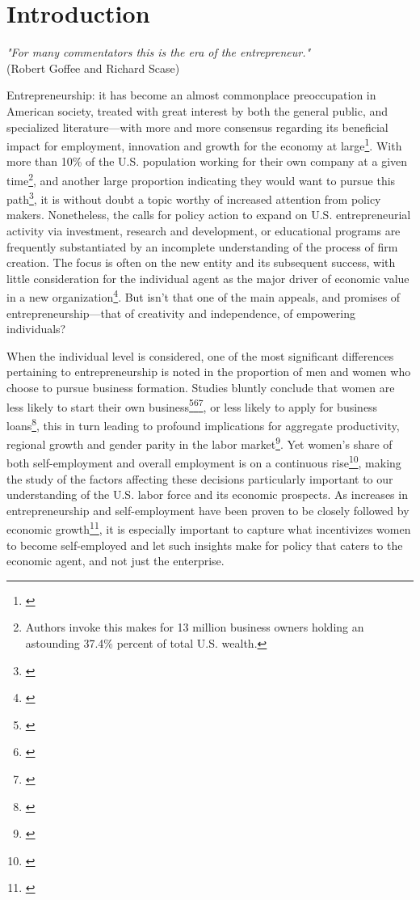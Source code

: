 \chapter{Introduction\label{ch:intro}}

\begin{flushright}
    \textit{"For many commentators this is the era of the entrepreneur." } \\
    (Robert Goffee and Richard Scase)
\end{flushright}


Entrepreneurship: it has become an almost commonplace preoccupation in American society, treated with great interest by both the general public, and specialized literature---with more and more consensus regarding its beneficial impact for employment, innovation and growth for the economy at large\footnote{\cite{ReynoldsWhite1997}}. With more than 10\% of the U.S. population working for their own company at a given time\footnote{Authors \cite{bucks2006recent} invoke this makes for 13 million business owners holding an astounding 37.4\% percent of total U.S. wealth. }, and another large proportion indicating they would want to pursue this path\footnote{\cite{kennickell2006currents}}, it is without doubt a topic worthy of increased attention from policy makers. Nonetheless, the calls for policy action to expand on U.S. entrepreneurial activity via investment, research and development, or educational programs are frequently substantiated by an incomplete understanding of the process of  firm creation.  The focus is often on the new entity and its subsequent success, with little consideration for the individual agent as the major driver of economic value in a new organization\footnote{\cite{BlanchflowerOswald1998}}. But isn't that one of the main appeals, and promises of entrepreneurship---that of creativity and independence, of empowering individuals?

When the individual level is considered, one of the most significant differences pertaining to
entrepreneurship is noted in the proportion of men and women who choose to pursue business formation. Studies bluntly conclude that women are less likely to start their own business\footnote{\cite{kennickell2006currents}}\hspace{.15em}\footnote{\cite{PatrickStephensWeinstein2016}}\hspace{.15em}\footnote{\cite{koellinger2013gender}}, or less likely to apply for business loans\footnote{\cite{SBA}}, this in turn leading to profound implications for aggregate productivity, regional growth and gender parity in the labor market\footnote{\cite{ReynoldsWhite1997}}. Yet women's share of both self-employment and overall employment is on a continuous rise\footnote{\cite{PatrickStephensWeinstein2016}}, making the study of the factors affecting these decisions particularly important to our understanding of the U.S. labor force and its economic prospects. As increases in entrepreneurship and self-employment have been proven to be closely followed by economic growth\footnote{\cite{ReynoldsWhite1997}}, it is especially important to capture what incentivizes women to become self-employed and let such insights make for policy that caters to the economic agent, and not just the enterprise.

